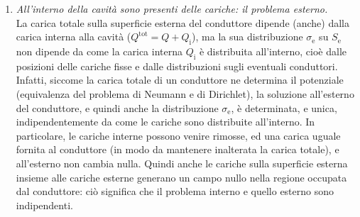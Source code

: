 \begin{enumerate}
    o cariche degli eventuali conduttori) e dal valore (costante) che il
    potenziale assume su $S_\mathrm{i}$. Il potenziale del conduttore, cio\`e
    della ``gabbia di Faraday'' \underline{dipende} dalle condizioni esterne (se
    si richiede
    che $\varphi(\infty)=0$), per cui se cambiano le condizioni esterne il
    potenziale all'interno cambia per una costante (additiva), ma questo \`e
    irrilevante perch\`e ci\`o che conta sono sempre le differenze di
    potenziale, ovvero il campo elettrico. Quindi all'interno della gabbia campo
    elettrico, differenze di potenziale e distribuzioni di carica sugli
    eventuali conduttori sono indipendenti dalle condizioni esterne e dalla
    carica del conduttore. Quindi, in particolare, siccome all'esterno il campo
    potrebbe anche essere nullo, le cariche sulla superficie interna
    $S_\mathrm{i}$ si distribuiscono in modo tale da garantire che il campo
    prodotto da esse e dalle cariche interne \`e nullo nella regione occupata
    dal conduttore.
  \item \emph{All'interno della cavit\`a sono presenti delle cariche: il
    problema esterno.}\\
    La carica totale sulla superficie esterna del conduttore dipende (anche)
    dalla carica interna alla cavit\`a ($Q^\mathrm{tot}=Q+Q_\mathrm{i}$), ma la
    sua distribuzione $\sigma_\mathrm{e}$ su $S_\mathrm{e}$ non dipende da come
    la carica interna $Q_\mathrm{i}$ \`e distribuita all'interno, cio\`e dalle
    posizioni delle cariche fisse e dalle distribuzioni sugli eventuali
    conduttori. Infatti, siccome la carica totale di un conduttore ne determina
    il potenziale (equivalenza del problema di Neumann e di Dirichlet), la
    soluzione all'esterno del conduttore, e quindi anche la distribuzione
    $\sigma_\mathrm{e}$, \`e determinata, e unica, indipendentemente da come le
    cariche sono distribuite all'interno. In particolare, le cariche interne
    possono venire rimosse, ed una carica uguale fornita al conduttore (in modo
    da mantenere inalterata la carica totale), e all'esterno non cambia nulla.
    Quindi anche le cariche sulla superficie esterna insieme alle cariche
    esterne generano un campo nullo nella regione occupata dal conduttore: ci\`o
    significa che il problema interno e quello esterno sono indipendenti.
\end{enumerate}

